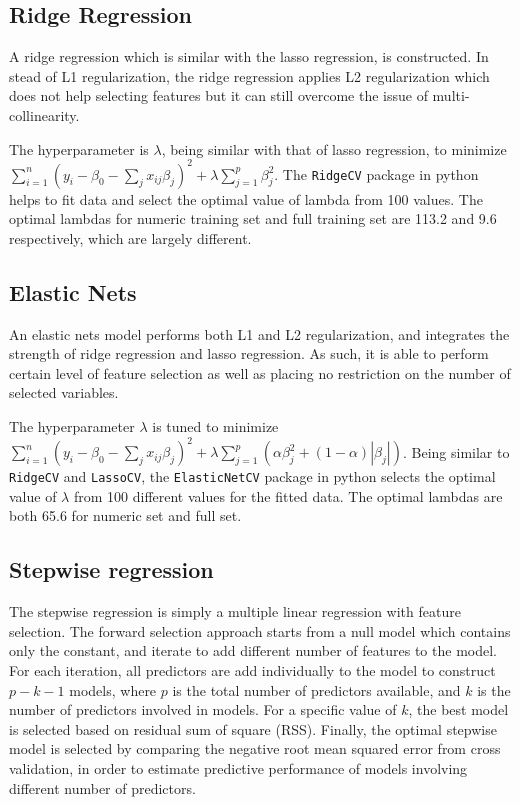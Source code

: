 \documentclass[letterpaper,12pt,twoside,]{pinp}
\begin{document}
\hypertarget{ridge-regression}{%
\subsection{Ridge Regression}\label{ridge-regression}}

A ridge regression which is similar with the lasso regression, is
constructed. In stead of L1 regularization, the ridge regression applies
L2 regularization which does not help selecting features but it can
still overcome the issue of multi-collinearity.

The hyperparameter is \(\lambda\), being similar with that of lasso
regression, to minimize
\(\sum^n_{i=1}(y_i-\beta_0-\sum_jx_{ij}\beta_j)^2+\lambda\sum^p_{j=1}\beta_j^2\).
The \texttt{RidgeCV} package in python helps to fit data and select the
optimal value of lambda from 100 values. The optimal lambdas for numeric
training set and full training set are 113.2 and 9.6 respectively, which
are largely different.

\hypertarget{elastic-nets}{%
\subsection{Elastic Nets}\label{elastic-nets}}

An elastic nets model performs both L1 and L2 regularization, and
integrates the strength of ridge regression and lasso regression. As
such, it is able to perform certain level of feature selection as well
as placing no restriction on the number of selected variables.

The hyperparameter \(\lambda\) is tuned to minimize
\(\sum^n_{i=1}(y_i-\beta_0-\sum_jx_{ij}\beta_j)^2+\lambda\sum^p_{j=1}(\alpha \beta_j^2+(1-\alpha)|\beta_j|)\).
Being similar to \texttt{RidgeCV} and \texttt{LassoCV}, the
\texttt{ElasticNetCV} package in python selects the optimal value of
\(\lambda\) from 100 different values for the fitted data. The optimal
lambdas are both 65.6 for numeric set and full set.

\hypertarget{stepwise-regression}{%
\subsection{Stepwise regression}\label{stepwise-regression}}

The stepwise regression is simply a multiple linear regression with
feature selection. The forward selection approach starts from a null
model which contains only the constant, and iterate to add different
number of features to the model. For each iteration, all predictors are
add individually to the model to construct \(p-k-1\) models, where \(p\)
is the total number of predictors available, and \(k\) is the number of
predictors involved in models. For a specific value of \(k\), the best
model is selected based on residual sum of square (RSS). Finally, the
optimal stepwise model is selected by comparing the negative root mean
squared error from cross validation, in order to estimate predictive
performance of models involving different number of predictors.
\end{document}
